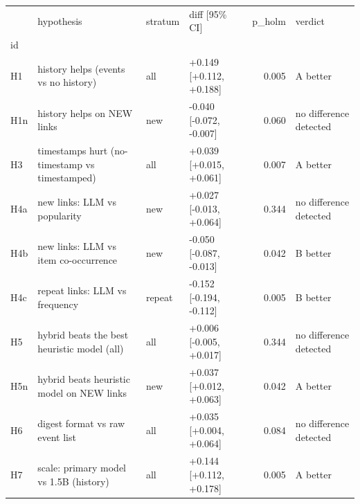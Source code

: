 \begin{tabular}{llllrl}
\toprule
 & hypothesis & stratum & diff [95\% CI] & p\_holm & verdict \\
id &  &  &  &  &  \\
\midrule
H1 & history helps (events vs no history) & all & +0.149 [+0.112, +0.188] & 0.005 & A better \\
H1n & history helps on NEW links & new & -0.040 [-0.072, -0.007] & 0.060 & no difference detected \\
H3 & timestamps hurt (no-timestamp vs timestamped) & all & +0.039 [+0.015, +0.061] & 0.007 & A better \\
H4a & new links: LLM vs popularity & new & +0.027 [-0.013, +0.064] & 0.344 & no difference detected \\
H4b & new links: LLM vs item co-occurrence & new & -0.050 [-0.087, -0.013] & 0.042 & B better \\
H4c & repeat links: LLM vs frequency & repeat & -0.152 [-0.194, -0.112] & 0.005 & B better \\
H5 & hybrid beats the best heuristic model (all) & all & +0.006 [-0.005, +0.017] & 0.344 & no difference detected \\
H5n & hybrid beats heuristic model on NEW links & new & +0.037 [+0.012, +0.063] & 0.042 & A better \\
H6 & digest format vs raw event list & all & +0.035 [+0.004, +0.064] & 0.084 & no difference detected \\
H7 & scale: primary model vs 1.5B (history) & all & +0.144 [+0.112, +0.178] & 0.005 & A better \\
\bottomrule
\end{tabular}
